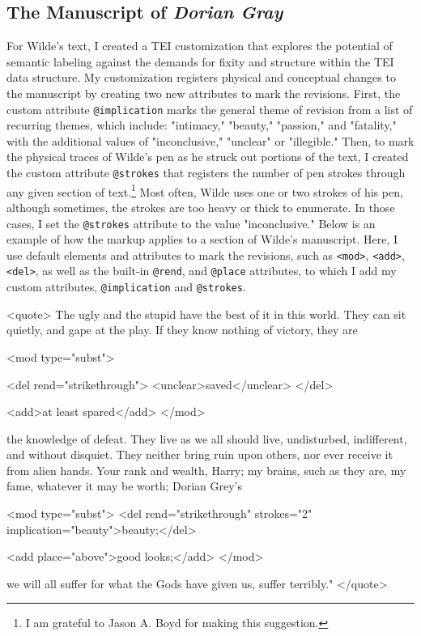 \documentclass[11pt]{article}
\begin{document}
\subsection{The Manuscript of \emph{Dorian Gray}}
\label{sec:orgd498446}
For Wilde's text, I created a TEI customization that explores the
potential of semantic labeling against the demands for fixity and
structure within the TEI data structure. My customization registers
physical and conceptual changes to the manuscript by creating two new
attributes to mark the revisions. First, the custom attribute
\texttt{@implication} marks the general theme of revision from a list of
recurring themes, which include: "intimacy," "beauty," "passion," and
"fatality," with the additional values of "inconclusive," "unclear" or
"illegible." Then, to mark the physical traces of Wilde's pen as he
struck out portions of the text, I created the custom attribute
\texttt{@strokes} that registers the number of pen strokes through any given
section of text.\footnote{I am grateful to Jason A. Boyd for making this suggestion.} Most often, Wilde uses one or two strokes of
his pen, although sometimes, the strokes are too heavy or thick to
enumerate. In those cases, I set the \texttt{@strokes} attribute to the value
"inconclusive." Below is an example of how the markup applies to a
section of Wilde's manuscript. Here, I use default elements and
attributes to mark the revisions, such as \texttt{<mod>}, \texttt{<add>}, \texttt{<del>},
as well as the built-in \texttt{@rend}, and \texttt{@place} attributes, to which I
add my custom attributes, \texttt{@implication} and \texttt{@strokes}.

\begin{SOURCE}
<quote> The ugly and the stupid have the best of it in this
world. They can sit quietly, and gape at the play. If they know
nothing of victory, they are 

<mod type="subst"> 

<del rend="strikethrough"> <unclear>saved</unclear> </del> 

<add>at least spared</add> </mod> 

the knowledge of defeat. They live as we all should live, undisturbed,
indifferent, and without disquiet. They neither bring ruin upon
others, nor ever receive it from alien hands. Your rank and wealth,
Harry; my brains, such as they are, my fame, whatever it may be worth;
Dorian Grey's 

<mod type="subst"> <del rend="strikethrough" strokes="2"
implication="beauty">beauty;</del> 

<add place="above">good looks;</add> </mod> 

we will all suffer for what the Gods have given us, suffer terribly."
</quote>
\end{SOURCE}
\end{document}
